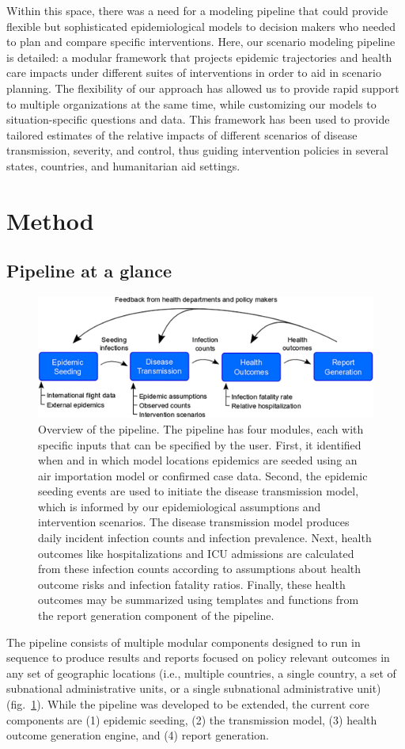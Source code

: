 Within this space, there was a need for a modeling pipeline that could provide flexible but sophisticated epidemiological models to decision makers who needed to plan and compare specific interventions. Here, our scenario modeling pipeline is detailed: a modular framework that projects epidemic trajectories and health care impacts under different suites of interventions in order to aid in scenario planning. The flexibility of our approach has allowed us to provide rapid support to multiple organizations at the same time, while customizing our models to situation-specific questions and data. This framework has been used to provide tailored estimates of the relative impacts of different scenarios of disease transmission, severity, and control, thus guiding intervention policies in several states, countries, and humanitarian aid settings.

\section{Method}
\subsection{Pipeline at a glance}
\begin{figure}[!htb]
    \centering
    \includegraphics[width = .8\textwidth]{fig_pipeline/fig1a}
    \caption[Overview of the pipeline.]{Overview of the pipeline. The pipeline has four modules, each with specific inputs that can be specified by the user. First, it identified when and in which model locations epidemics are seeded using an air importation model or confirmed case data. Second, the epidemic seeding events are used to initiate the disease transmission model, which is informed by our epidemiological assumptions and intervention scenarios. The disease transmission model produces daily incident infection counts and infection prevalence. Next, health outcomes like hospitalizations and ICU admissions are calculated from these infection counts according to assumptions about health outcome risks and infection fatality ratios. Finally, these health outcomes may be summarized using templates and functions from the report generation component of the pipeline.}
    \label{fig:pipeline-modules}
\end{figure}
The pipeline consists of multiple modular components designed to run in sequence to produce results and reports focused on policy relevant outcomes in any set of geographic locations (i.e., multiple countries, a single country, a set of subnational administrative units, or a single subnational administrative unit) (fig.~\ref{fig:pipeline-modules}). While the pipeline was developed to be extended, the current core components are (1) epidemic seeding, (2) the transmission model, (3) health outcome generation engine, and (4) report generation. 

